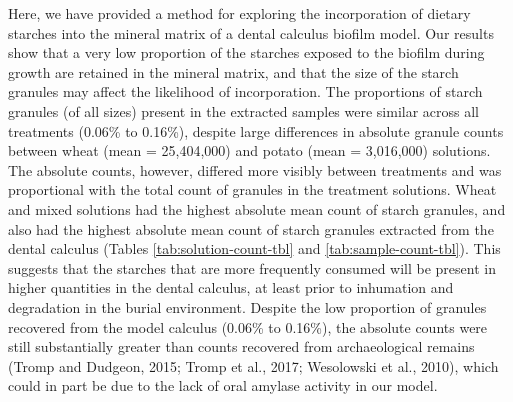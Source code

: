 \documentclass[utf8]{frontiers/frontiersSCNS}
\begin{document}
Here, we have provided a method for exploring the incorporation of dietary
starches into the mineral matrix of a dental calculus biofilm model. Our results show
that a very low proportion of the starches exposed to the biofilm during growth are
retained in the mineral matrix, and that the size of the starch granules
may affect the likelihood of incorporation. The proportions of starch granules
(of all sizes) present in the extracted samples were similar across all treatments
(0.06\% to 0.16\%),
despite large differences in absolute granule counts between wheat
(mean = 25,404,000)
and potato
(mean = 3,016,000)
solutions.\\
The absolute counts, however, differed more visibly between treatments and was
proportional with the total count of granules in the treatment solutions. Wheat
and mixed solutions had the highest absolute mean count of starch granules, and
also had the highest absolute mean count of starch granules extracted from the
dental calculus
(Tables \ref{tab:solution-count-tbl} and \ref{tab:sample-count-tbl}).
This suggests that the starches that are more frequently consumed will be present
in higher quantities in the dental calculus, at least prior to inhumation and
degradation in the burial environment.
Despite the low proportion of granules recovered from the model calculus
(0.06\% to 0.16\%),
the absolute counts were still substantially greater than counts recovered from
archaeological remains
(Tromp and Dudgeon, 2015; Tromp et al., 2017; Wesolowski et al., 2010), which could in part be due to the
lack of oral amylase activity in our model.
\end{document}
